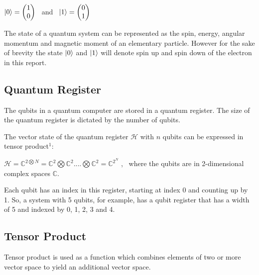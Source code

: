 \documentclass{article}
\begin{document}
\qquad $\ket{0} = \begin{pmatrix}1 \\ 0 \end{pmatrix}$ \ and \ $\ket{1} = \begin{pmatrix} 0 \\ 1 \end{pmatrix}$

\vspace{5mm}

\noindent
The state of a quantum system can be represented as the spin, energy, angular momentum and magnetic moment of an elementary particle. However for the sake of brevity the state $\ket{0}$ and $\ket{1}$ will denote spin up and spin down of the electron in this report.
\pagebreak

\subsection{Quantum Register}
\vspace{5mm}

\noindent
The qubits in a quantum computer are stored in a quantum register. The size of the quantum register is dictated by the number of qubits. 
\vspace{5mm}

\noindent
The vector state of the quantum register $\mathcal{H}$ with $n$ qubits can be expressed in tensor product\hyperlink{1}{$^1$}:
\vspace{5mm}


\qquad $\mathcal{H} = \mathbb{C}^{2\bigotimes N} = \mathbb{C}^2 \bigotimes\mathbb{C}^2 ....\bigotimes\mathbb{C}^2 = \mathbb{C}^{2^N} $ , \  where the qubits are in 2-dimensional complex spaces $\mathbb{C}$.
\vspace{5mm}

\noindent
Each qubit has an index in this register, starting at index 0 and counting up by 1. So, a system with 5 qubits, for example, has a qubit register that has a width of 5 and indexed by 0, 1, 2, 3 and 4.

\subsection{Tensor Product}
\vspace{5mm}

\noindent
Tensor product is used as a function which combines elements of two or more vector space to yield an additional vector space. 
\vspace{5mm}
\end{document}
